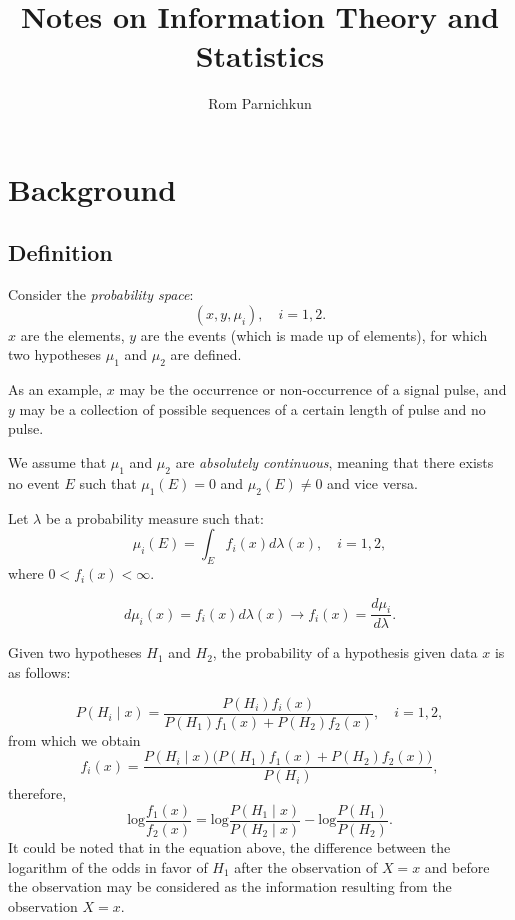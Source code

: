 \documentclass[twocolumn]{article}
\theoremstyle{plain}
\begin{document}
\title{Notes on Information Theory and Statistics}
\author{Rom Parnichkun}

\maketitle

\section{Background}

\subsection{Definition}

Consider the \textit{probability space}:
\begin{equation}
    (x, y, \mu_i), \quad i = 1,2.
\end{equation}
$x$ are the elements, $y$ are the events (which is made up of elements), for which two hypotheses $\mu_1$ and $\mu_2$ are defined.

As an example, $x$ may be the occurrence or non-occurrence of a signal pulse, and $y$ may be a collection of possible sequences of a certain length of pulse and no pulse.

We assume that $\mu_1$ and $\mu_2$ are \textit{absolutely continuous}, meaning that there exists no event $E$ such that $\mu_1(E) = 0$ and $\mu_2(E) \not = 0$ and vice versa.

Let $\lambda$ be a probability measure such that:
\begin{equation}
    \mu_i(E) = \int_{E}{f_i(x)d\lambda(x),} \quad i = 1,2,
\end{equation}
where $0<f_i(x)<\infty$.

\begin{equation}
    d\mu_i(x) = f_i(x) d \lambda(x) \rightarrow f_i(x) = \frac{d\mu_i}{d\lambda}.
\end{equation}

Given two hypotheses $H_1$ and $H_2$, the probability of a hypothesis given data $x$ is as follows:

\begin{equation}
    P(H_i \mid x) = \frac{P(H_i)f_i(x)}{P(H_1)f_1(x) + P(H_2)f_2(x)}, \quad i = 1,2,
\end{equation}
from which we obtain
\begin{equation}
    f_i(x) = \frac{P(H_i\mid x)\big(P(H_1)f_1(x) + P(H_2)f_2(x)\big)}{P(H_i)},
\end{equation}
therefore,
\begin{equation}
    \text{log}\frac{f_1(x)}{f_2(x)} = \text{log}\frac{P(H_1 \mid x)}{P(H_2 \mid x)} - \text{log}\frac{P(H_1)}{P(H_2)}.
\end{equation}
It could be noted that in the equation above, the difference between the logarithm of the odds in favor of $H_1$ after the observation of $X = x$ and before the observation may be considered as the information resulting from the observation $X = x$. 
\end{document}
